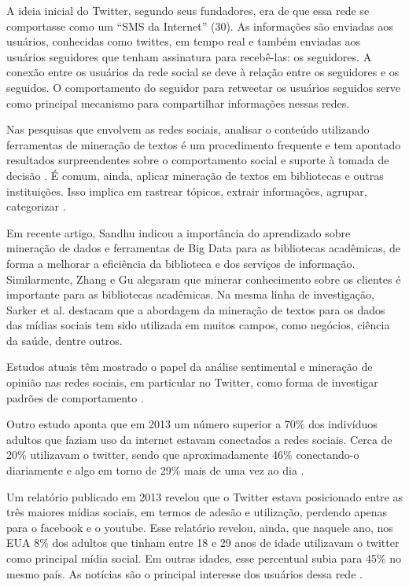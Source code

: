 A ideia inicial do Twitter, segundo seus fundadores, era de que essa rede se comportasse como um “SMS da Internet” (30). As informações são enviadas aos usuários, conhecidas como twittes, em tempo real e também enviadas aos usuários seguidores que tenham assinatura para recebê-las: os seguidores. A conexão entre os usuários da rede social se deve à relação entre os seguidores e os seguidos. O comportamento do seguidor para retweetar os usuários seguidos serve como principal mecanismo para compartilhar informações nessas redes.

Nas pesquisas que envolvem as redes sociais, analisar o conteúdo utilizando ferramentas de mineração de textos é um procedimento frequente e tem apontado resultados surpreendentes sobre o comportamento social e suporte à tomada de decisão \cite{abrahams2015integrated}. É comum, ainda, aplicar mineração de textos em bibliotecas e outras instituições. Isso implica em rastrear tópicos, extrair informações, agrupar, categorizar \cite{fan2006tapping}.

Em recente artigo, Sandhu \cite{sandhu2015scheduling} indicou a importância do aprendizado sobre mineração de dados e ferramentas de Big Data para as bibliotecas acadêmicas, de forma a melhorar a eficiência da biblioteca e dos serviços de informação. Similarmente, Zhang e Gu \cite{zhang2011text} alegaram que minerar conhecimento sobre os clientes é importante para as bibliotecas acadêmicas. Na mesma linha de investigação, Sarker et al. \cite{sarker2015utilizing} destacam que a abordagem da mineração de textos para os dados das mídias sociais tem sido utilizada em muitos campos, como negócios, ciência da saúde, dentre outros. 

Estudos atuais têm mostrado o papel da análise sentimental e mineração de opinião nas redes sociais, em particular no Twitter, como forma de investigar padrões de comportamento \cite{pak2010twitter} \cite{kumar2012sentiment}.


Outro estudo aponta que em 2013 um número superior a 70\% dos indivíduos adultos que faziam uso da internet estavam conectados a redes sociais. Cerca de 20\% utilizavam o twitter, sendo que aproximadamente 46\% conectando-o diariamente e algo em torno de 29\% mais de uma vez ao dia \cite{madden2013teens}. 

Um relatório publicado em 2013 revelou que o Twitter estava posicionado entre as três maiores mídias sociais, em termos de adesão e utilização, perdendo apenas para o facebook e o youtube. Esse relatório revelou, ainda, que naquele ano, nos EUA 8\% dos adultos que tinham entre 18 e 29 anos de idade utilizavam o twitter como principal mídia social. Em outras idades, esse percentual subia para 45\% no mesmo país. As notícias são o principal interesse dos usuários dessa rede \cite{mitchell2013news}. 

